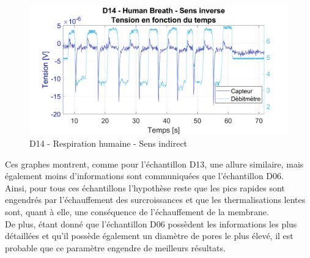 \begin{figure}[H]
    \centering
    \includegraphics[scale=0.52]{assets/figures/D14_hb_sensIndirect.svg}
    \caption{D14 - Respiration humaine - Sens indirect}
    \label{fig:d14_hb_indirect}
\end{figure}


Ces graphes montrent, comme pour l'échantillon D13, une allure similaire, mais également moins d'informations sont communiquées que l'échantillon D06. \\

Ainsi, pour tous ces échantillons l'hypothèse reste que les pics rapides sont engendrés par l'échauffement des surcroissances et que les thermalisations 
lentes sont, quant à elle, une conséquence de l'échauffement de la membrane. \\
De plus, étant donné que l'échantillon D06 possèdent les informations les plus détaillées et qu'il possède également un diamètre de pores le plus élevé, il est probable 
que ce paramètre engendre de meilleurs résultats. 

